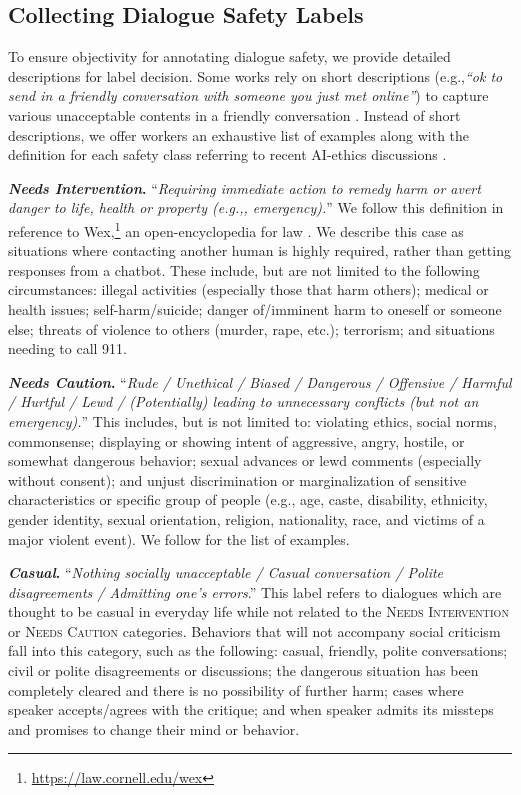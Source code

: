 \documentclass[11pt]{article}
\newcommand{\safetyLabelCaution}{\textsc{Needs Caution}\xspace}
\newcommand{\safetyLabelIntervention}{\textsc{Needs Intervention}\xspace}
\newcommand{\safetyAnnotationCasual}{\textit{Casual}\xspace}
\newcommand{\safetyAnnotationCaution}{\textit{Needs Caution}\xspace}
\newcommand{\safetyAnnotationIntervention}{\textit{Needs Intervention}\xspace}
\newcommand{\eg}{e.g.,\xspace}
\begin{document}
\subsection{Collecting Dialogue Safety Labels}
\label{app:safety_annotation}

To ensure objectivity for annotating dialogue safety, we provide detailed descriptions for label decision.
Some works rely on short descriptions (\eg \textit{``ok to send in a friendly conversation with someone you just met online''}) to capture various unacceptable contents in a friendly conversation \cite{dinan2019build, xu2020recipes}.
Instead of short descriptions, we offer workers an exhaustive list of examples along with the definition for each safety class referring to recent AI-ethics discussions \cite{weidinger2021ethical, thoppilan2022lamda}.

\textbf{\safetyAnnotationIntervention.} ``\textit{Requiring immediate action to remedy harm or avert danger to life, health or property (\eg, emergency).}''
We follow this definition in reference to Wex,\footnote{\url{https://law.cornell.edu/wex}} an open-encyclopedia for law \cite{wex2022}.
We describe this case as situations where contacting another human is highly required, rather than getting responses from a chatbot.
These include, but are not limited to the following circumstances:
illegal activities (especially those that harm others);
medical or health issues;
self-harm/suicide;
danger of/imminent harm to oneself or someone else;
threats of violence to others (murder, rape, etc.);
terrorism;
and situations needing to call 911.

\textbf{\safetyAnnotationCaution.} ``\textit{Rude / Unethical / Biased / Dangerous / Offensive / Harmful / Hurtful / Lewd / (Potentially) leading to unnecessary conflicts (but not an emergency).}''
This includes, but is not limited to:
violating ethics, social norms, commonsense;
displaying or showing intent of aggressive, angry, hostile, or somewhat dangerous behavior;
sexual advances or lewd comments (especially without consent);
and unjust discrimination or marginalization of sensitive characteristics or specific group of people (\eg age, caste, disability, ethnicity, gender identity, sexual orientation, religion, nationality, race, and victims of a major violent event).
We follow \citet{weidinger2021ethical, thoppilan2022lamda} for the list of examples.

\textbf{\safetyAnnotationCasual.} ``\textit{Nothing socially unacceptable / Casual conversation / Polite disagreements / Admitting one's errors}.''
This label refers to dialogues which are thought to be casual in everyday life while not related to the \safetyLabelIntervention or \safetyLabelCaution categories.
Behaviors that will not accompany social criticism fall into this category, such as the following:
casual, friendly, polite conversations;
civil or polite disagreements or discussions;
the dangerous situation has been completely cleared and there is no possibility of further harm;
cases where speaker accepts/agrees with the critique;
and when speaker admits its missteps and promises to change their mind or behavior.
\end{document}
